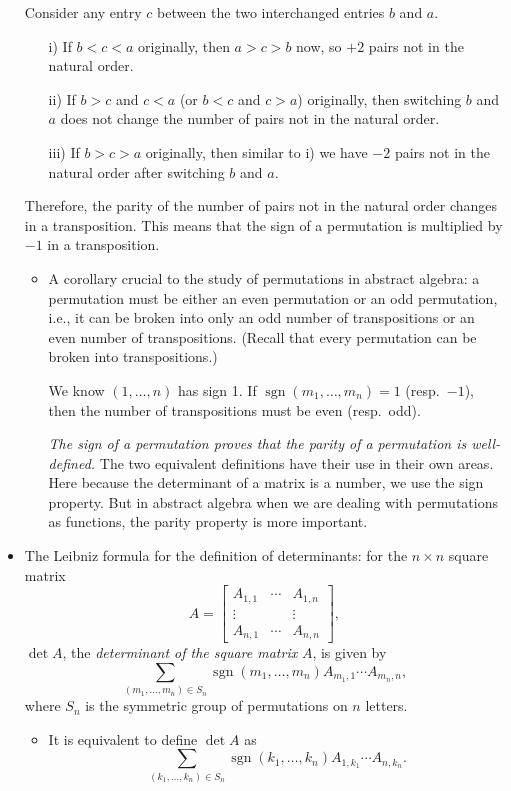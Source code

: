 \documentclass[11pt]{article}
\newcommand{\df}[1]{\textit{\textsf{#1}}}
\newcommand{\sgn}{\operatorname{sgn}}
\begin{document}
\begin{itemize}
    Consider any entry $c$ between the two interchanged entries $b$ and $a$.
    \begin{enumerate}
        \item [i)] If $b < c < a$ originally, then $a > c > b$ now, so $+2$ pairs not in the natural order.
        \item [ii)] If $b > c$ and $c < a$ (or $b < c$ and $c > a$) originally, then switching $b$ and $a$ does not change the number of pairs not in the natural order.
        \item [iii)] If $b > c > a$ originally, then similar to i) we have $-2$ pairs not in the natural order after switching $b$ and $a$.
    \end{enumerate}
    Therefore, the parity of the number of pairs not in the natural order changes in a transposition. This means that the sign of a permutation is multiplied by $-1$ in a transposition.
    \begin{itemize}
        \item A corollary crucial to the study of permutations in abstract algebra: a permutation must be either an even permutation or an odd permutation, i.e., it can be broken into only an odd number of transpositions or an even number of transpositions. (Recall that every permutation can be broken into transpositions.)

        We know $(1,\dots,n)$ has sign 1. If $\sgn(m_1,\dots,m_n) = 1$ (resp.\ $-1$), then the number of transpositions must be even (resp.\ odd).

        \emph{The sign of a permutation proves that the parity of a permutation is well-defined.} The two equivalent definitions have their use in their own areas. Here because the determinant of a matrix is a number, we use the sign property. But in abstract algebra when we are dealing with permutations as functions, the parity property is more important.
    \end{itemize}
    \item The Leibniz formula for the definition of determinants: for the $n \times n$ square matrix \[A = \begin{bmatrix}
        A_{1,1} & \cdots & A_{1,n} \\ \vdots & & \vdots \\ A_{n,1} & \cdots & A_{n,n}
    \end{bmatrix},\] $\det A$, the \df{determinant of the square matrix} $A$, is given by \[\sum_{(m_1,\dots,m_n) \in S_n} \sgn (m_1,\dots,m_n) A_{m_1,1} \cdots A_{m_n,n},\] where $S_n$ is the symmetric group of permutations on $n$ letters.
    \begin{itemize}
        \item It is equivalent to define $\det A$ as \begin{equation}
            \sum_{(k_1,\dots,k_n) \in S_n} \sgn (k_1,\dots,k_n) A_{1,k_1} \cdots A_{n,k_n}.
        \end{equation}


\end{itemize}
\end{itemize}
\end{document}
